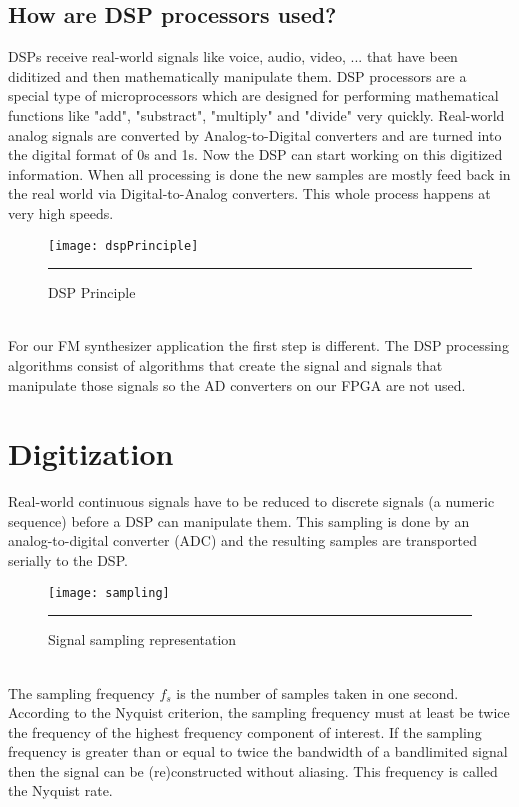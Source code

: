 \subsection{How are DSP processors used?}
DSPs receive real-world signals like voice, audio, video, ... that have been diditized and then mathematically manipulate them. DSP processors are a special type of microprocessors which are designed for performing mathematical functions like "add", "substract", "multiply" and "divide" very quickly.
Real-world analog signals are converted by Analog-to-Digital converters and are turned into the digital format of 0s and 1s. Now the DSP can start working on this digitized information. When all processing is done the new samples are mostly feed back in the real world via Digital-to-Analog converters. This whole process happens at very high speeds.\\
\begin{figure}[htbp]
\centering
\texttt{[image: dspPrinciple]}
\rule{30em}{0.5pt}
\caption{DSP Principle}
\label{fig:dspPrinciple}
\end{figure} \\
For our FM synthesizer application the first step is different. The DSP processing algorithms consist of algorithms that create the signal and signals that manipulate those signals so the AD converters on our FPGA are not used.

\section{Digitization}  %
Real-world continuous signals have to be reduced to discrete signals (a numeric sequence) before a DSP can manipulate them. This sampling is done by an analog-to-digital converter (ADC) and the resulting samples are transported serially to the DSP.
\begin{figure}[htbp]
\centering
\texttt{[image: sampling]}
\rule{30em}{0.5pt}
\caption{Signal sampling representation}
\label{fig:sampling}
\end{figure} \\
The sampling frequency $f_{s}$ is the number of samples taken in one second. According to the Nyquist criterion, the sampling frequency must at least be twice the frequency of the highest frequency component of interest. If the sampling frequency is greater than or equal to twice the bandwidth of a bandlimited signal then the signal can be (re)constructed without aliasing. This frequency is called the Nyquist rate. 

